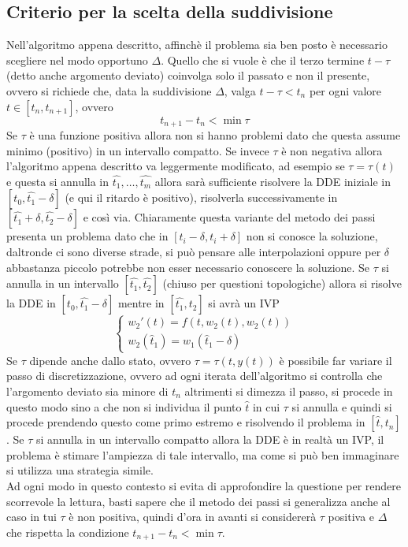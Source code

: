 \subsection{Criterio per la scelta della suddivisione}
Nell'algoritmo appena descritto, affinchè il problema sia ben posto è necessario scegliere nel modo opportuno $\Delta$.
Quello che si vuole è che il terzo termine $t-\tau$ (detto anche argomento deviato) coinvolga 
solo il passato e non il presente, ovvero si richiede che, data la suddivisione $\Delta$, valga 
 $t-\tau < t_n$ per ogni valore $t \in [t_n,t_{n+1}]$, ovvero
$$
t_{n+1} - t_n < \min{\tau}
$$
Se $\tau$ è una funzione positiva allora non si hanno problemi dato che questa assume minimo (positivo) in un intervallo compatto.
Se invece $\tau$ è non negativa allora l'algoritmo appena descritto va leggermente modificato, ad esempio se $\tau=\tau(t)$ e questa 
si annulla in $\widehat{t_1}, \dots, \widehat{t_m}$ allora sarà sufficiente risolvere la DDE iniziale in $[t_0, \widehat{t_1}-\delta]$ 
(e qui il ritardo è positivo), risolverla successivamente in $[\widehat{t_1}+ \delta, \widehat{t_2}-\delta]$ e così via.
Chiaramente questa variante del metodo dei passi presenta un problema dato che in $[t_i - \delta, t_i + \delta]$ non si conosce 
la soluzione, daltronde ci sono diverse strade, si può pensare alle interpolazioni oppure per $\delta$ abbastanza piccolo potrebbe 
non esser necessario conoscere la soluzione.
Se $\tau$ si annulla in un intervallo $[\widehat{t_1},\widehat{t_2}]$ (chiuso per questioni topologiche) allora si risolve la DDE 
in $[t_0, \widehat{t_1}- \delta]$ mentre in $[\widehat{t_1},\widehat{t_2}]$ si avrà un IVP
$$
\begin{cases}
 w_2'(t)		=	f(t,w_2(t),w_2(t))		\\
 w_2(\widehat{t}_1)	=	w_1(\widehat{t}_1 -\delta)
\end{cases}
$$
Se $\tau$ dipende anche dallo stato, ovvero $\tau=\tau(t,y(t))$ è possibile far variare il passo di discretizzazione, ovvero ad ogni 
iterata dell'algoritmo si controlla che l'argomento deviato sia minore di $t_n$ altrimenti si dimezza il passo, si procede in questo 
modo sino a che non si individua il punto $\widehat{t}$ in cui $\tau$ si annulla e quindi si procede prendendo questo come primo estremo e 
risolvendo il problema in $[\widehat{t},t_n]$. Se $\tau$ si annulla in un intervallo compatto allora la DDE è in realtà un IVP, il problema 
è stimare l'ampiezza di tale intervallo, ma come si può ben immaginare si utilizza una strategia simile.
\\[1cm]
Ad ogni modo in questo contesto si evita di approfondire la questione per rendere scorrevole 
la lettura, basti sapere che il metodo dei passi si generalizza anche al caso in tui $\tau$ è non positiva, quindi 
d'ora in avanti si considererà $\tau$ positiva e $\Delta$ che rispetta la condizione $t_{n+1} - t_n < \min{\tau}$.

